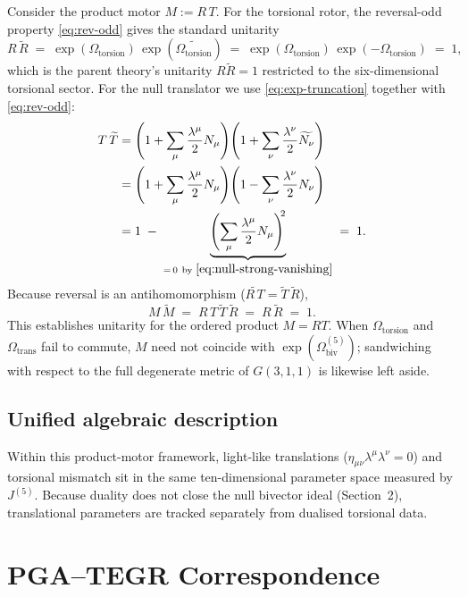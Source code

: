 \documentclass[dvipdfmx,a4paper]{article}
\theoremstyle{definition}
\theoremstyle{plain}
\theoremstyle{remark}
\begin{document}
Consider the product motor \(M:=R\,T\). For the torsional rotor, the reversal-odd property \eqref{eq:rev-odd} gives the standard unitarity
\[
R \, \widetilde{R} \;=\; \exp(\Omega_{\text{torsion}})\,\exp(\widetilde{\Omega_{\text{torsion}}})
\;=\; \exp(\Omega_{\text{torsion}})\,\exp(-\Omega_{\text{torsion}}) \;=\; 1,
\]
which is the parent theory's unitarity \(R\widetilde{R}=1\) restricted to the six-dimensional torsional sector. For the null translator we use \eqref{eq:exp-truncation} together with \eqref{eq:rev-odd}:
\begin{align}
T \, \widetilde{T}
&= \left(1+\sum_{\mu}\frac{\lambda^{\mu}}{2}N_{\mu}\right)\!\left(1+\sum_{\nu}\frac{\lambda^{\nu}}{2}\widetilde{N_{\nu}}\right) \notag\\
&= \left(1+\sum_{\mu}\frac{\lambda^{\mu}}{2}N_{\mu}\right)\!\left(1-\sum_{\nu}\frac{\lambda^{\nu}}{2}N_{\nu}\right) \notag\\
&= 1 \;-\; \underbrace{\left(\sum_{\mu}\frac{\lambda^{\mu}}{2}N_{\mu}\right)^{\!\!2}}_{=\,0\ \text{by }\eqref{eq:null-strong-vanishing}}
\;=\; 1.
\label{eq:null-unitarity}
\end{align}
Because reversal is an antihomomorphism (\(\widetilde{R\,T}=\widetilde{T}\,\widetilde{R}\)),
\begin{equation}
M\,\widetilde{M}
\;=\; R\,T\,\widetilde{T}\,\widetilde{R}
\;=\; R\,\widetilde{R}
\;=\; 1.
\end{equation}
This establishes unitarity for the ordered product \(M=RT\). When \(\Omega_{\text{torsion}}\) and \(\Omega_{\text{trans}}\) fail to commute, \(M\) need not coincide with \(\exp(\Omega_{\text{biv}}^{(5)})\); sandwiching with respect to the full degenerate metric of \(G(3,1,1)\) is likewise left aside.

\subsection{Unified algebraic description}

Within this product-motor framework, light-like translations (\(\eta_{\mu\nu}\lambda^{\mu}\lambda^{\nu}=0\)) and torsional mismatch sit in the same ten-dimensional parameter space measured by \(J^{(5)}\). Because duality does not close the null bivector ideal (Section~2), translational parameters are tracked separately from dualised torsional data.

\section{PGA--TEGR Correspondence}
\label{sec:pga-tegr}
\label{sec:schwarzschild-pga}
\end{document}
